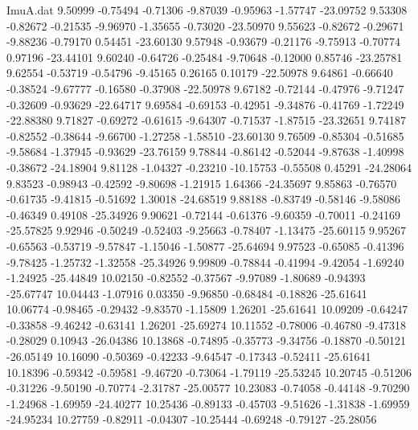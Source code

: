 \begin{filecontents}{ImuA.dat}
   9.50999   -0.75494   -0.71306   -9.87039   -0.95963   -1.57747  -23.09752
   9.53308   -0.82672   -0.21535   -9.96970   -1.35655   -0.73020  -23.50970
   9.55623   -0.82672   -0.29671   -9.88236   -0.79170    0.54451  -23.60130
   9.57948   -0.93679   -0.21176   -9.75913   -0.70774    0.97196  -23.44101
   9.60240   -0.64726   -0.25484   -9.70648   -0.12000    0.85746  -23.25781
   9.62554   -0.53719   -0.54796   -9.45165    0.26165    0.10179  -22.50978
   9.64861   -0.66640   -0.38524   -9.67777   -0.16580   -0.37908  -22.50978
   9.67182   -0.72144   -0.47976   -9.71247   -0.32609   -0.93629  -22.64717
   9.69584   -0.69153   -0.42951   -9.34876   -0.41769   -1.72249  -22.88380
   9.71827   -0.69272   -0.61615   -9.64307   -0.71537   -1.87515  -23.32651
   9.74187   -0.82552   -0.38644   -9.66700   -1.27258   -1.58510  -23.60130
   9.76509   -0.85304   -0.51685   -9.58684   -1.37945   -0.93629  -23.76159
   9.78844   -0.86142   -0.52044   -9.87638   -1.40998   -0.38672  -24.18904
   9.81128   -1.04327   -0.23210  -10.15753   -0.55508    0.45291  -24.28064
   9.83523   -0.98943   -0.42592   -9.80698   -1.21915    1.64366  -24.35697
   9.85863   -0.76570   -0.61735   -9.41815   -0.51692    1.30018  -24.68519
   9.88188   -0.83749   -0.58146   -9.58086   -0.46349    0.49108  -25.34926
   9.90621   -0.72144   -0.61376   -9.60359   -0.70011   -0.24169  -25.57825
   9.92946   -0.50249   -0.52403   -9.25663   -0.78407   -1.13475  -25.60115
   9.95267   -0.65563   -0.53719   -9.57847   -1.15046   -1.50877  -25.64694
   9.97523   -0.65085   -0.41396   -9.78425   -1.25732   -1.32558  -25.34926
   9.99809   -0.78844   -0.41994   -9.42054   -1.69240   -1.24925  -25.44849
  10.02150   -0.82552   -0.37567   -9.97089   -1.80689   -0.94393  -25.67747
  10.04443   -1.07916    0.03350   -9.96850   -0.68484   -0.18826  -25.61641
  10.06774   -0.98465   -0.29432   -9.83570   -1.15809    1.26201  -25.61641
  10.09209   -0.64247   -0.33858   -9.46242   -0.63141    1.26201  -25.69274
  10.11552   -0.78006   -0.46780   -9.47318   -0.28029    0.10943  -26.04386
  10.13868   -0.74895   -0.35773   -9.34756   -0.18870   -0.50121  -26.05149
  10.16090   -0.50369   -0.42233   -9.64547   -0.17343   -0.52411  -25.61641
  10.18396   -0.59342   -0.59581   -9.46720   -0.73064   -1.79119  -25.53245
  10.20745   -0.51206   -0.31226   -9.50190   -0.70774   -2.31787  -25.00577
  10.23083   -0.74058   -0.44148   -9.70290   -1.24968   -1.69959  -24.40277
  10.25436   -0.89133   -0.45703   -9.51626   -1.31838   -1.69959  -24.95234
  10.27759   -0.82911   -0.04307  -10.25444   -0.69248   -0.79127  -25.28056

\end{filecontents}
